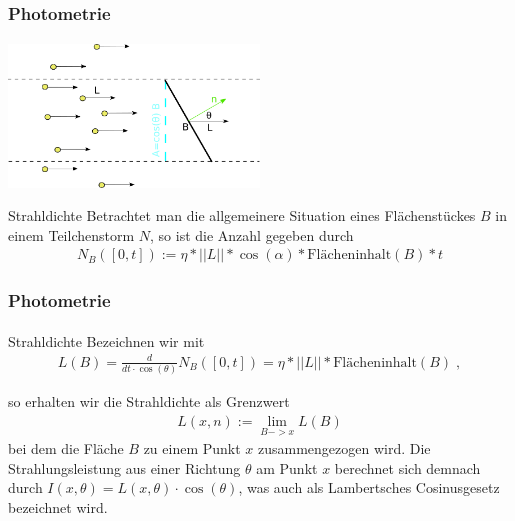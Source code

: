 \documentclass{beamer}
\begin{document}
\begin{frame}
    \frametitle{Photometrie}
\framesubtitle{}

\begin{center}

    \includegraphics[width=0.5\textwidth]{images/Strahldichte.png}
\end{center}


\begin{block}{Strahldichte}
 Betrachtet man die allgemeinere Situation eines Flächenstückes $B$  in einem Teilchenstorm $N$, so ist die Anzahl gegeben durch 
\begin{align}
N_B([0,t]) := \eta * ||L||  * \cos(\alpha) *  \text{Flächeninhalt} (B) * t
 \end{align}


\end{block}
\end{frame}




\begin{frame}
    \frametitle{Photometrie}
\framesubtitle{}

\begin{block}{Strahldichte}
Bezeichnen wir mit 
\begin{align*}
L(B) = \frac{d}{dt \cdot \cos(\theta)}N_B([0,t]) = \eta * ||L||  *  \text{Flächeninhalt} (B) \; , 
 \end{align*}

so erhalten wir die   Strahldichte als Grenzwert
\begin{align*}
L(x, n):= \lim_{B -> x} L(B)
 \end{align*}
bei dem die Fläche $B$  zu einem Punkt $x$ zusammengezogen wird.  Die Strahlungsleistung aus einer Richtung $\theta$  am Punkt $x$ berechnet sich demnach durch $I(x, \theta) = L(x, \theta) \cdot \cos(\theta)$, was auch als Lambertsches Cosinusgesetz bezeichnet wird.
\end{block}
\end{frame}
\end{document}
